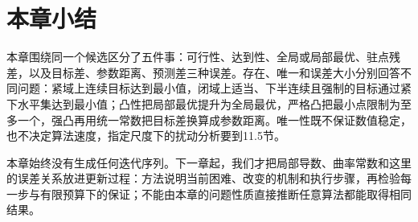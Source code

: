 \section{本章小结}

本章围绕同一个候选区分了五件事：可行性、达到性、全局或局部最优、驻点残差，以及目标差、参数距离、预测差三种误差。存在、唯一和误差大小分别回答不同问题：紧域上连续目标达到最小值，闭域上适当、下半连续且强制的目标通过紧下水平集达到最小值；凸性把局部最优提升为全局最优，严格凸把最小点限制为至多一个，强凸再用统一常数把目标差换算成参数距离。唯一性既不保证数值稳定，也不决定算法速度，指定尺度下的扰动分析要到11.5节。

本章始终没有生成任何迭代序列。下一章起，我们才把局部导数、曲率常数和这里的误差关系放进更新过程：方法说明当前困难、改变的机制和执行步骤，再检验每一步与有限预算下的保证；不能由本章的问题性质直接推断任意算法都能取得相同结果。
